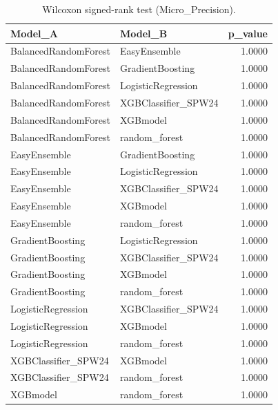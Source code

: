 \begin{table}[t]
\centering
\begin{tabular}{llr}
\toprule
Model_A & Model_B & p_value \\
\midrule
BalancedRandomForest & EasyEnsemble & 1.0000 \\
BalancedRandomForest & GradientBoosting & 1.0000 \\
BalancedRandomForest & LogisticRegression & 1.0000 \\
BalancedRandomForest & XGBClassifier_SPW24 & 1.0000 \\
BalancedRandomForest & XGBmodel & 1.0000 \\
BalancedRandomForest & random_forest & 1.0000 \\
EasyEnsemble & GradientBoosting & 1.0000 \\
EasyEnsemble & LogisticRegression & 1.0000 \\
EasyEnsemble & XGBClassifier_SPW24 & 1.0000 \\
EasyEnsemble & XGBmodel & 1.0000 \\
EasyEnsemble & random_forest & 1.0000 \\
GradientBoosting & LogisticRegression & 1.0000 \\
GradientBoosting & XGBClassifier_SPW24 & 1.0000 \\
GradientBoosting & XGBmodel & 1.0000 \\
GradientBoosting & random_forest & 1.0000 \\
LogisticRegression & XGBClassifier_SPW24 & 1.0000 \\
LogisticRegression & XGBmodel & 1.0000 \\
LogisticRegression & random_forest & 1.0000 \\
XGBClassifier_SPW24 & XGBmodel & 1.0000 \\
XGBClassifier_SPW24 & random_forest & 1.0000 \\
XGBmodel & random_forest & 1.0000 \\
\bottomrule
\end{tabular}
\caption{Wilcoxon signed-rank test (Micro_Precision).}
\label{tab:wilcoxon_Micro_Precision}
\end{table}